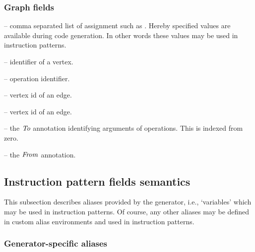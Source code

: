 \subsubsection{Graph fields}
\begin{description}
\item{} -- comma separated list of assignment such as . Hereby specified values are available during code generation. In other words these values may be used in instruction patterns.
\item{} -- identifier of a vertex.
\item{} -- operation identifier.
\item{} -- vertex id of an edge.
\item{} -- vertex id of an edge.
\item{} -- the $\mf{to}$ annotation identifying arguments of operations. This is indexed from zero.
\item{} -- the $\mf{from}$ annotation.
\end{description}

\subsection{Instruction pattern fields semantics}

This subsection describes aliases provided by the generator, i.e., `variables' which may be used in instruction patterns. Of course, any other aliases may be defined in custom alias environments and used in instruction patterns.


\subsubsection{Generator-specific aliases}

